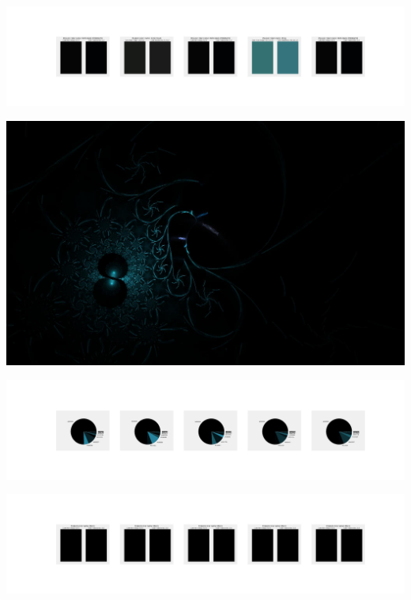 \documentclass[11pt]{article}
\begin{document}
\begin{landscape}
    \begin{center}
    \includegraphics[width=250mm]{./nbimg/peak-399.jpg}
    \end{center}
    

    \begin{center}
    \includegraphics[width=\textwidth]{./nbimg/file (53).jpg}
    \end{center}

    \begin{center}
    \includegraphics[width=250mm]{./nbimg/pie-400.jpg}
    \end{center}

    \begin{center}
    \includegraphics[width=250mm]{./nbimg/peak-400.jpg}
    \end{center}
    


\end{landscape}
\end{document}
